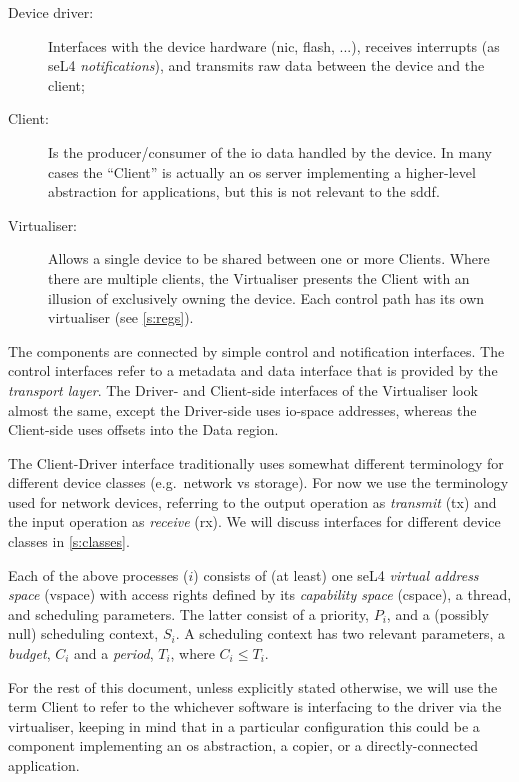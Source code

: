 \documentclass[a4paper,12pt]{report}
\newcommand{\Obj}[1]{\textsl{#1}}
\begin{document}
\begin{description}
\item[Device driver:] Interfaces with the device hardware (\gls{nic},
  flash, ...), receives interrupts (as seL4 \Obj{notifications}), and
  transmits raw data between the device and the client;
\item[Client:] Is the producer/consumer of the \gls{io} data handled by
  the device. In many cases the ``Client'' is actually an \gls{os} server
  implementing a higher-level abstraction for applications, but this
  is not relevant to the \gls{sddf}.
\item[Virtualiser:] Allows a single device to be shared between one or
  more Clients. Where there are multiple clients, the Virtualiser presents the
  Client with an illusion of exclusively owning the device. Each
  control path has its own virtualiser (see \autoref{s:regs}).
\end{description}

The components are connected by simple control and notification
interfaces. The control interfaces refer to a metadata and data interface that is
provided by the \emph{transport layer}. The Driver- and Client-side
interfaces of the Virtualiser look almost the same, except the
Driver-side uses \gls{io}-space addresses, whereas the Client-side uses
offsets into the Data region.

The Client-Driver interface traditionally uses somewhat different
terminology for different device classes (e.g.\ network vs
storage). For now we use the terminology used for network devices,
referring to the output operation as \emph{transmit} (\gls{tx}) and the
input operation as \emph{receive} (\gls{rx}). We will discuss interfaces for
different device classes in \autoref{s:classes}.

Each of the above processes (\(i\)) consists of (at least) one seL4
\emph{virtual address space} (\gls{vspace}) with access
rights defined by its \emph{capability space} (\gls{cspace}), a thread, and scheduling parameters. The
latter consist of a
priority, \(P_i\), and a (possibly null) scheduling context, \(S_i\). A
scheduling context has two relevant parameters, a \emph{budget},
\(C_i\) and a \emph{period}, \(T_i\), where \(C_i \leq T_i\).

For the rest of this document, unless explicitly stated otherwise, we
will use the term Client to refer to the whichever software is
interfacing to the driver via the virtualiser, keeping in mind that in a particular
configuration this could be a component implementing an
\gls{os} abstraction, a copier, or a directly-connected
application.
\end{document}
